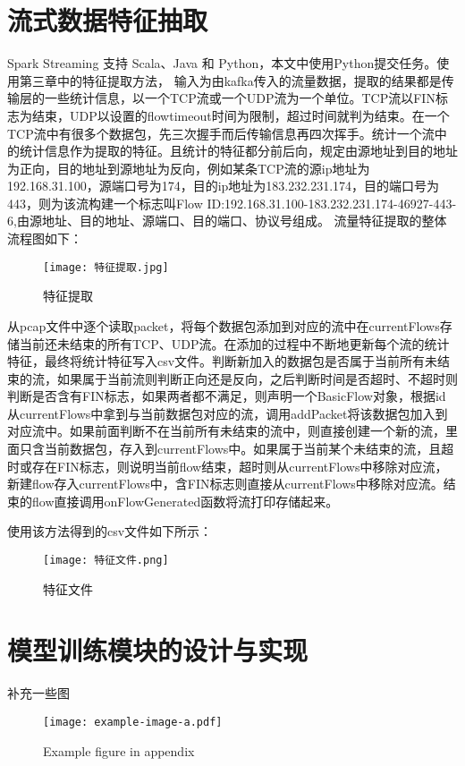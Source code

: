 \section{流式数据特征抽取}
Spark Streaming 支持 Scala、Java 和 Python，本文中使用Python提交任务。使用第三章中的特征提取方法，
输入为由kafka传入的流量数据，提取的结果都是传输层的一些统计信息，以一个TCP流或一个UDP流为一个单位。TCP流以FIN标志为结束，UDP以设置的flowtimeout时间为限制，超过时间就判为结束。在一个TCP流中有很多个数据包，先三次握手而后传输信息再四次挥手。统计一个流中的统计信息作为提取的特征。且统计的特征都分前后向，规定由源地址到目的地址为正向，目的地址到源地址为反向，例如某条TCP流的源ip地址为192.168.31.100，源端口号为174，目的ip地址为183.232.231.174，目的端口号为443，则为该流构建一个标志叫Flow ID:192.168.31.100-183.232.231.174-46927-443-6,由源地址、目的地址、源端口、目的端口、协议号组成。
流量特征提取的整体流程图如下：

\begin{figure}
    \centering
    \texttt{[image: 特征提取.jpg]}
    \caption{特征提取}
    \label{fig:特征提取}
  \end{figure}

从pcap文件中逐个读取packet，将每个数据包添加到对应的流中在currentFlows存储当前还未结束的所有TCP、UDP流。在添加的过程中不断地更新每个流的统计特征，最终将统计特征写入csv文件。判断新加入的数据包是否属于当前所有未结束的流，如果属于当前流则判断正向还是反向，之后判断时间是否超时、不超时则判断是否含有FIN标志，如果两者都不满足，则声明一个BasicFlow对象，根据id从currentFlows中拿到与当前数据包对应的流，调用addPacket将该数据包加入到对应流中。如果前面判断不在当前所有未结束的流中，则直接创建一个新的流，里面只含当前数据包，存入到currentFlows中。如果属于当前某个未结束的流，且超时或存在FIN标志，则说明当前flow结束，超时则从currentFlows中移除对应流，新建flow存入currentFlows中，含FIN标志则直接从currentFlows中移除对应流。结束的flow直接调用onFlowGenerated函数将流打印存储起来。

使用该方法得到的csv文件如下所示：
\begin{figure}
    \centering
    \texttt{[image: 特征文件.png]}
    \caption{特征文件}
    \label{fig:特征文件}
  \end{figure}


\section{模型训练模块的设计与实现}
补充一些图
\begin{figure}
  \centering
  \texttt{[image: example-image-a.pdf]}
  \caption{Example figure in appendix}
  \label{fig:appendix-survey-figure}
\end{figure}

